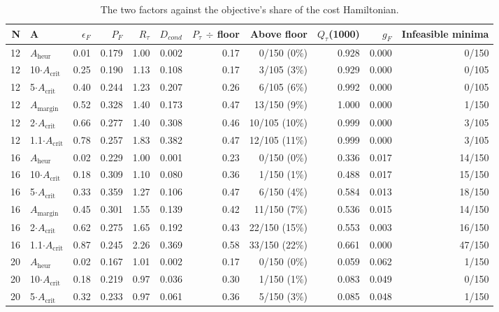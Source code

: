 \documentclass{ieeeaccess}
\begin{document}
\begin{table}[!t]
\centering
\scriptsize
\caption{The two factors against the objective's share of the cost Hamiltonian.}
\label{tab:III}
\begin{tabular}{rlrrrrrrrrr}
\toprule
N & A & $\epsilon_{F}$ & $P_{F}$ & $R_{\tau}$ & $D_{cond}$ & $P_{\tau}$ $\div$ floor & Above floor & $Q_{\tau}$(1000) & $g_{F}$ & Infeasible minima \\
\midrule
12 & $A_{\mathrm{heur}}$ & 0.01 & 0.179 & 1.00 & 0.002 & 0.17 & 0/150 (0\%) & 0.928 & 0.000 & 0/150 \\
12 & 10$\cdot$$A_{\mathrm{crit}}$ & 0.25 & 0.190 & 1.13 & 0.108 & 0.17 & 3/105 (3\%) & 0.929 & 0.000 & 0/105 \\
12 & 5$\cdot$$A_{\mathrm{crit}}$ & 0.40 & 0.244 & 1.23 & 0.207 & 0.26 & 6/105 (6\%) & 0.992 & 0.000 & 0/105 \\
12 & $A_{\mathrm{margin}}$ & 0.52 & 0.328 & 1.40 & 0.173 & 0.47 & 13/150 (9\%) & 1.000 & 0.000 & 1/150 \\
12 & 2$\cdot$$A_{\mathrm{crit}}$ & 0.66 & 0.277 & 1.40 & 0.308 & 0.46 & 10/105 (10\%) & 0.999 & 0.000 & 3/105 \\
12 & 1.1$\cdot$$A_{\mathrm{crit}}$ & 0.78 & 0.257 & 1.83 & 0.382 & 0.47 & 12/105 (11\%) & 0.999 & 0.000 & 3/105 \\
16 & $A_{\mathrm{heur}}$ & 0.02 & 0.229 & 1.00 & 0.001 & 0.23 & 0/150 (0\%) & 0.336 & 0.017 & 14/150 \\
16 & 10$\cdot$$A_{\mathrm{crit}}$ & 0.18 & 0.309 & 1.10 & 0.080 & 0.36 & 1/150 (1\%) & 0.488 & 0.017 & 15/150 \\
16 & 5$\cdot$$A_{\mathrm{crit}}$ & 0.33 & 0.359 & 1.27 & 0.106 & 0.47 & 6/150 (4\%) & 0.584 & 0.013 & 18/150 \\
16 & $A_{\mathrm{margin}}$ & 0.45 & 0.301 & 1.55 & 0.139 & 0.42 & 11/150 (7\%) & 0.536 & 0.015 & 14/150 \\
16 & 2$\cdot$$A_{\mathrm{crit}}$ & 0.62 & 0.275 & 1.65 & 0.192 & 0.43 & 22/150 (15\%) & 0.553 & 0.003 & 16/150 \\
16 & 1.1$\cdot$$A_{\mathrm{crit}}$ & 0.87 & 0.245 & 2.26 & 0.369 & 0.58 & 33/150 (22\%) & 0.661 & 0.000 & 47/150 \\
20 & $A_{\mathrm{heur}}$ & 0.02 & 0.167 & 1.01 & 0.002 & 0.17 & 0/150 (0\%) & 0.059 & 0.062 & 1/150 \\
20 & 10$\cdot$$A_{\mathrm{crit}}$ & 0.18 & 0.219 & 0.97 & 0.036 & 0.30 & 1/150 (1\%) & 0.083 & 0.049 & 0/150 \\
20 & 5$\cdot$$A_{\mathrm{crit}}$ & 0.32 & 0.233 & 0.97 & 0.061 & 0.36 & 5/150 (3\%) & 0.085 & 0.048 & 1/150 \\

\end{tabular}
\end{table}
\end{document}
